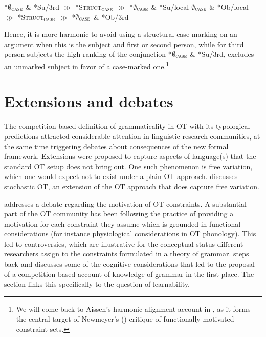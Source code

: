 \documentclass[output=paper,hidelinks]{langscibook}
\begin{document}
\ea\label{ex:subhier2}
 \ea 
 *$\emptyset_\textsc{case}$ \&  *Su/3rd $\gg$ *\textsc{Struct}$_\textsc{case}$ $\gg$ *$\emptyset_\textsc{case}$ \&  *Su/local
 \ex *$\emptyset_\textsc{case}$ \&  *Ob/local $\gg$ *\textsc{Struct}$_\textsc{case}$ $\gg$ *$\emptyset_\textsc{case}$ \&  *Ob/3rd
 \z
\z

\noindent
Hence, it is more harmonic to avoid using a structural case marking on an argument when this is the subject and first or second person, while for third person subjects the high ranking of the conjunction *$\emptyset_\textsc{case}$ \& *Su/3rd, excludes an unmarked subject in favor of a case-marked one.\footnote{We will come back to Aissen's harmonic alignment account in , as it forms the central target of Newmeyer's (\citeyear{Newmeyer2002}) critique of functionally motivated constraint sets.}



\section{Extensions and debates}
\label{sec:OT:extensions-and-motivation}

The competition-based definition of grammaticality in OT with its typological predictions attracted considerable attention in linguistic research communities, at the same time triggering debates about consequences of the new formal framework. Extensions were proposed to capture aspects of language(s) that the standard OT setup does not bring out.
One such phenomenon is free variation, which one would expect not to exist under a plain OT approach.  discusses stochastic OT, an extension of the OT approach that does capture free variation.

 addresses a debate regarding the motivation of OT constraints. A substantial part of the OT community has been following the practice of providing a motivation for each constraint they assume which is grounded in functional considerations (for instance physiological considerations in OT phonology). This led to controversies, which are illustrative for the conceptual status different researchers assign to the constraints formulated in a theory of grammar.
 steps back and discusses some of the cognitive considerations that led to the proposal of a competition-based account of knowledge of grammar in the first place. The section links this specifically to the question of learnability.
\end{document}
